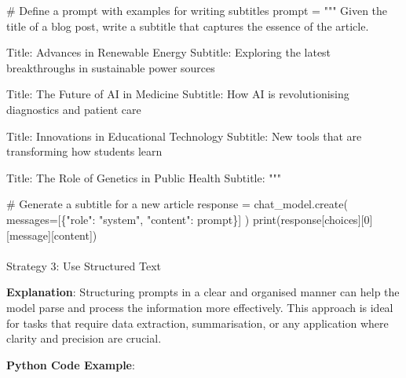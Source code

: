 \documentclass[
]{agujournal2019}
\makeatletter
\let\oldparagraph\paragraph
\renewcommand{\paragraph}{
    \@ifstar
      \xxxParagraphStar
      \xxxParagraphNoStar
  }
\newcommand{\xxxParagraphStar}[1]{\oldparagraph*{#1}\mbox{}}
\newcommand{\xxxParagraphNoStar}[1]{\oldparagraph{#1}\mbox{}}
\newenvironment{Shaded}{\begin{snugshade}}{\end{snugshade}}
\newcommand{\BuiltInTok}[1]{\textcolor[rgb]{0.00,0.23,0.31}{#1}}
\newcommand{\CommentTok}[1]{\textcolor[rgb]{0.37,0.37,0.37}{#1}}
\newcommand{\DecValTok}[1]{\textcolor[rgb]{0.68,0.00,0.00}{#1}}
\newcommand{\NormalTok}[1]{\textcolor[rgb]{0.00,0.23,0.31}{#1}}
\newcommand{\OperatorTok}[1]{\textcolor[rgb]{0.37,0.37,0.37}{#1}}
\newcommand{\StringTok}[1]{\textcolor[rgb]{0.13,0.47,0.30}{#1}}
\makeatother
\begin{document}
\begin{Shaded}
\begin{Highlighting}[]
\CommentTok{\# Define a prompt with examples for writing subtitles}
\NormalTok{prompt }\OperatorTok{=} \StringTok{"""}
\StringTok{Given the title of a blog post, write a subtitle that captures the essence of the article.}

\StringTok{Title: Advances in Renewable Energy}
\StringTok{Subtitle: Exploring the latest breakthroughs in sustainable power sources}

\StringTok{Title: The Future of AI in Medicine}
\StringTok{Subtitle: How AI is revolutionising diagnostics and patient care}

\StringTok{Title: Innovations in Educational Technology}
\StringTok{Subtitle: New tools that are transforming how students learn}

\StringTok{Title: The Role of Genetics in Public Health}
\StringTok{Subtitle: }
\StringTok{"""}

\CommentTok{\# Generate a subtitle for a new article}
\NormalTok{response }\OperatorTok{=}\NormalTok{ chat\_model.create(}
\NormalTok{    messages}\OperatorTok{=}\NormalTok{[\{}\StringTok{"role"}\NormalTok{: }\StringTok{"system"}\NormalTok{, }\StringTok{"content"}\NormalTok{: prompt\}]}
\NormalTok{)}
\BuiltInTok{print}\NormalTok{(response[}\StringTok{\textquotesingle{}choices\textquotesingle{}}\NormalTok{][}\DecValTok{0}\NormalTok{][}\StringTok{\textquotesingle{}message\textquotesingle{}}\NormalTok{][}\StringTok{\textquotesingle{}content\textquotesingle{}}\NormalTok{])}
\end{Highlighting}
\end{Shaded}

\paragraph{Strategy 3: Use Structured
Text}\label{strategy-3-use-structured-text}

\textbf{Explanation}: Structuring prompts in a clear and organised
manner can help the model parse and process the information more
effectively. This approach is ideal for tasks that require data
extraction, summarisation, or any application where clarity and
precision are crucial.

\textbf{Python Code Example}:
\end{document}
